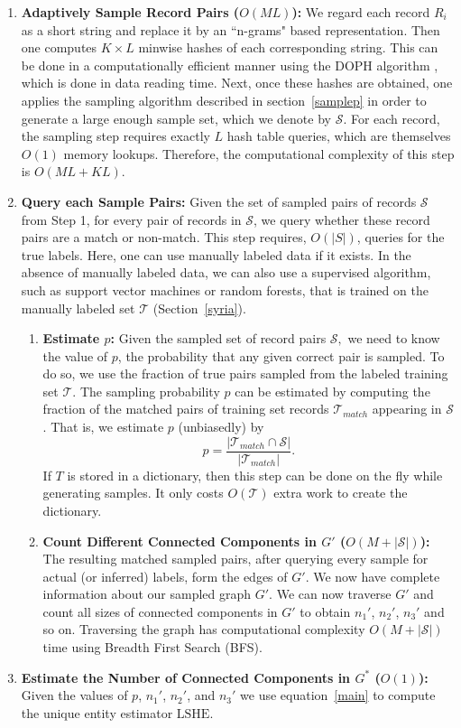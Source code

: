 \documentclass{imsart}
\begin{document}
\begin{enumerate}
    \item {\bf Adaptively Sample Record Pairs ($O(ML)$):} We regard each record $R_i$ as a short string and replace it by an ``n-grams" based representation. Then one computes $K \times L$  minwise hashes of each corresponding string. This can be done in a computationally efficient manner using the DOPH algorithm \citep{shrivastava2017optimal}, which is done in data reading time. Next, once these hashes are obtained, one applies the sampling algorithm described in section~\ref{samplep} in order to generate a large enough sample set, which we denote by $\mathcal{S}$. For each record, the sampling step requires exactly $L$ hash table queries, which are themselves $O(1)$ memory lookups. Therefore, the computational complexity of this step is $O(ML +KL).$
    \item {\bf Query each Sample Pairs:} Given the set of sampled pairs of records $\mathcal{S}$ from Step 1, for every pair of records in $\mathcal{S}$, we query whether these record pairs are a match or non-match. This step requires, $O(|S|)$, queries for the true labels. Here, one can use manually labeled data if it exists. In the absence of manually labeled data, we can also use a supervised algorithm, such as support vector machines or random forests, that is trained on the manually labeled set $\mathcal{T}$ (Section~\ref{syria}).
    \begin{enumerate}
        \item {\bf Estimate $p$:} Given the sampled set of record pairs $\mathcal{S},$ we need to know the value of $p$, the probability that any given correct pair is sampled. To do so, we use the fraction of true pairs sampled from the labeled training set $\mathcal{T}.$ The sampling probability $p$ can be estimated by computing the fraction of the matched pairs of training set records $\mathcal{T}_{match}$ appearing in $\mathcal{S}$. That is, we estimate $p$ (unbiasedly) by $$p = \frac{|\mathcal{T}_{match} \cap \mathcal{S}|}{|\mathcal{T}_{match}|}.$$ If $T$ is stored in a dictionary, then this step can be done on the fly while generating samples. It only costs $O(\mathcal{T})$ extra work to create the dictionary.

    \item {\bf Count Different Connected Components in $G'$ ($O(M+|\mathcal{S}|)$):}
        The resulting matched sampled pairs, after querying every sample for actual (or inferred) labels, form the edges of $G'$. We now have complete information about our sampled graph $G'$. We can now traverse $G'$ and count all sizes of connected components in $G'$ to obtain $n_1'$, $n_2'$, $n_3'$ and so on. Traversing the graph has computational complexity $O(M + |\mathcal{S}|)$ time using Breadth First Search (BFS).
    \end{enumerate}
    \item {\bf Estimate the Number of Connected Components in $G^*$ ($O(1)$):} Given the values of $p$, $n_1'$, $n_2'$, and $n_3'$  we use equation~\ref{main} to compute the unique entity estimator $\text{LSHE}$.
\end{enumerate}
\end{document}

